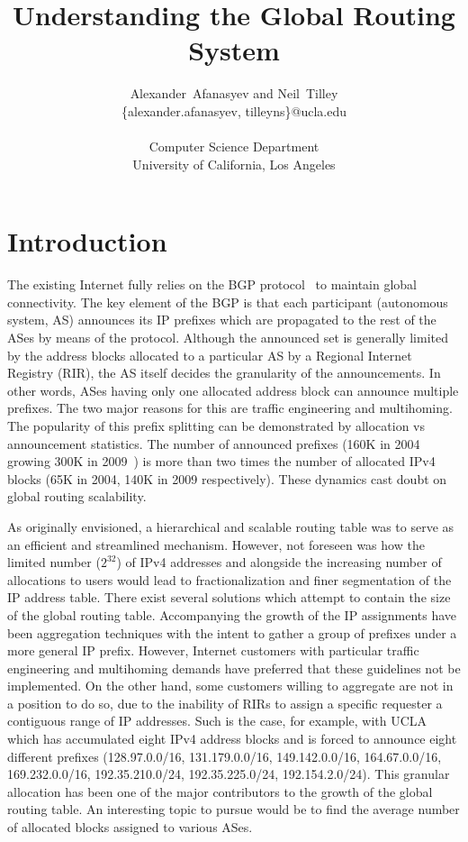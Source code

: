 \documentclass[conference]{IEEEtran}
\title{Understanding the Global Routing System}
\author{Alexander~Afanasyev %
and Neil~Tilley \\ %
\small \{alexander.afanasyev, tilleyns\}@ucla.edu \\ \\
\small Computer Science Department \\
\small University of California, Los Angeles 
}
\begin{document}
\maketitle

\section{Introduction}

The existing Internet fully relies on the BGP protocol~\cite{Rekhter:1995:RFC1771-BGP} to maintain global connectivity. The key element of the BGP is that each participant (autonomous system, AS) announces its IP prefixes which are propagated to the rest of the ASes by means of the protocol. Although the announced set is generally limited by the address blocks allocated to a particular AS by a Regional Internet Registry (RIR), the AS itself decides the granularity of the announcements. In other words, ASes having only one allocated address block can announce multiple prefixes. The two major reasons for this are traffic engineering and multihoming. The popularity of this prefix splitting can be demonstrated by allocation vs announcement statistics. The number of announced prefixes (160K in 2004~\cite{Meng:2005:IPv4-address} growing 300K in 2009~\cite{::BGP-Reports}) is more than two times the number of allocated IPv4 blocks (65K in 2004, 140K in 2009 respectively). These dynamics cast doubt on global routing scalability.

As originally envisioned, a hierarchical and scalable routing table was to serve as an efficient and streamlined mechanism. However, not foreseen was how the limited number ($2^{32}$) of IPv4 addresses and alongside the increasing number of allocations to users would lead to fractionalization and finer segmentation of the IP address table. There exist several solutions which attempt to contain the size of the global routing table.  Accompanying the growth of the IP assignments have been aggregation techniques with the intent to gather a group of prefixes under a more general IP prefix. However, Internet customers with particular traffic engineering and multihoming demands have preferred that these guidelines not be implemented. On the other hand, some customers willing to aggregate are not in a position to do so, due to the inability of RIRs to assign a specific requester a contiguous range of IP addresses. Such is the case, for example, with UCLA which has accumulated eight IPv4 address blocks and is forced to announce eight different prefixes (128.97.0.0/16, 131.179.0.0/16, 149.142.0.0/16, 164.67.0.0/16, 169.232.0.0/16, 192.35.210.0/24, 192.35.225.0/24, 192.154.2.0/24). This granular allocation has been one of the major contributors to the growth of the global routing table. An interesting topic to pursue would be to find the average number of allocated blocks assigned to various ASes.
\end{document}
